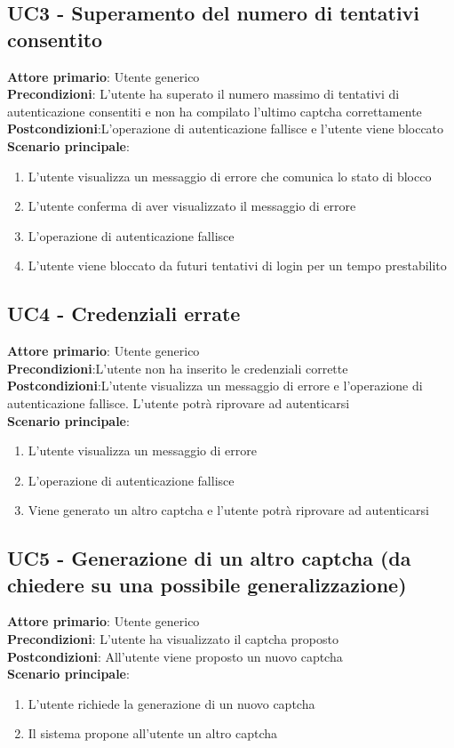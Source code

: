 \subsection{UC3 - Superamento del numero di tentativi consentito}
\textbf{Attore primario}: Utente generico\\
\textbf{Precondizioni}: L’utente ha superato il numero massimo di tentativi di autenticazione consentiti e non ha compilato l’ultimo captcha correttamente\\
\textbf{Postcondizioni}:L’operazione di autenticazione fallisce e l’utente viene bloccato\\
\textbf{Scenario principale}:
\begin{enumerate}
   \item L’utente visualizza un messaggio di errore che comunica lo stato di blocco
   \item L'utente conferma di aver visualizzato il messaggio di errore
   \item L’operazione di autenticazione fallisce
   \item L’utente viene bloccato da futuri tentativi di login per un tempo prestabilito
\end{enumerate}

\subsection{UC4 - Credenziali errate}
\textbf{Attore primario}: Utente generico\\
\textbf{Precondizioni}:L’utente non ha inserito le credenziali corrette\\
\textbf{Postcondizioni}:L’utente visualizza un messaggio di errore e l’operazione di autenticazione fallisce. L’utente potrà riprovare  ad autenticarsi\\
\textbf{Scenario principale}:
\begin{enumerate}
   \item L’utente visualizza un messaggio di errore
   \item L’operazione di autenticazione fallisce
   \item Viene generato un altro captcha e l’utente potrà riprovare ad autenticarsi
\end{enumerate}

\subsection{UC5 - Generazione di un altro captcha (da chiedere su una possibile generalizzazione)}
\textbf{Attore primario}: Utente generico\\
\textbf{Precondizioni}: L’utente ha visualizzato il captcha proposto\\
\textbf{Postcondizioni}: All’utente viene proposto un nuovo captcha\\
\textbf{Scenario principale}:
\begin{enumerate}
   \item L’utente richiede la generazione di un nuovo captcha
   \item Il sistema propone all’utente un altro captcha
\end{enumerate}